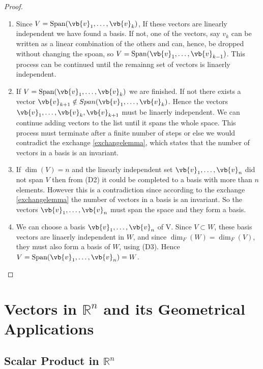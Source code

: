 \documentclass[a4paper,12pt]{report}
\begin{document}
\begin{proof}

\begin{enumerate}[label=(\(D\)\arabic*)] 
    \item Since \(V = \text{Span}(\vb{v}_{1}, \ldots, \vb{v}_k ) \), If these vectors are linearly independent we have found a basis. If not, one of the vectors, say \(v_{k} \) can be written as a linear combination of the others and can, hence, be dropped without changing the spoan, so \(V = \text{Span}(\vb{v}_{1}, \ldots, \vb{v}_{k-1}) \). This process can be continued until the remainng set of vectors is linaerly independent.
    \item If \(V= \text{Span}(\vb{v}_{1}, \ldots, \vb{v}_k) \) we are finished. If not there exists a vector \(\vb{v} _{k+1} \notin Span(\vb{v}_{1}, \ldots, \vb{v}_k) \). Hence the vectors \(\vb{v}_{1}, \ldots, \vb{v}_k, \vb{v} _{k+1} \) must be linaerly independent. We can continue adding vectors to the list until it spans the whole space. This process must terminate after a finite number of steps or else we would contradict the exchange \cref{exchangelemma}, which states that the number of vectors in a basis is an invariant.
    \item If \(\dim (V) = n\) and the linearly independent set \(\vb{v}_{1}, \ldots, \vb{v}_n \) did not span \(V\) then from (D2) it could be completed to a basis with more than \(n\) elements. However this is a contradiction since according to the exchange \cref{exchangelemma} the number of vectors in a basis is an invariant. So the vectors \(\vb{v}_{1}, \ldots, \vb{v}_n \) must span the space and they form a basis.
    \item We can choose a basis \(\vb{v}_{1}, \ldots, \vb{v}_n \) of V. Since \(V \subset W\), these basis vectors are linaerly independent in \(W\), and since \(\dim _{F} (W) = \dim _{F} (V)  \), they must also form a basis of \(W\), using (D3). Hence \(V = \text{Span}(\vb{v}_{1}, \ldots, \vb{v}_n ) = W \).         
\end{enumerate}

\end{proof}


\chapter{Vectors in \(\mathbb{R}^{n} \) and its Geometrical Applications }

\section{Scalar Product in \(\mathbb{R}^{n} \) }
\end{document}
